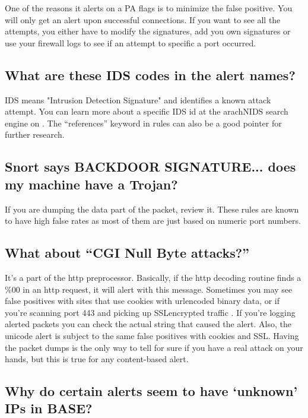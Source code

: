 \documentclass{article}
\begin{document}
One of the reasons it alerts on a PA flags is to minimize the false
positive. You will only get an alert upon successful connections. If you
want to see all the attempts, you either have to modify the signatures, add
you own signatures or use your firewall logs to see if an attempt to
specific a port occurred.


\subsection{What are these IDS codes in the alert names? }

IDS means "Intrusion Detection Signature" and identifies a
known attack attempt. You can learn more about a specific IDS id
at the arachNIDS search engine on 
.
The ``references'' keyword in rules can also be a good pointer 
for further research.


\subsection{Snort says BACKDOOR SIGNATURE... does my machine have a Trojan? }

If you are dumping the data part of the packet, review it.
These rules are known to have high false rates as most of them
are just based on numeric port numbers.


\subsection{What about ``CGI Null Byte attacks?'' }

It's a part of the http preprocessor. Basically, if the http decoding 
routine finds a \%00 in an http request, it will alert with this message. 
Sometimes you may see false positives with sites that use cookies with
urlencoded binary data, or if you're scanning port 443 and picking up 
SSLencrypted  traffic . If you're logging alerted packets you can  check
the  actual string that caused the alert.  Also, the unicode alert is
subject to  the same false positives with cookies and SSL. Having the packet
dumps is the  only way to tell for sure if you have a real attack on your
hands, but this  is true for any content-based alert.

\subsection{Why do certain alerts seem to have `unknown' IPs in BASE?  }
\end{document}
